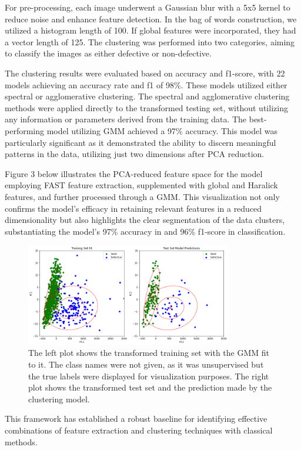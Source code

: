 \documentclass[conference]{IEEEtran}
\begin{document}
For pre-processing, each image underwent a Gaussian blur with a 5x5 kernel to reduce noise and enhance feature detection. In the bag of words construction, we utilized a histogram length of 100. If global features were incorporated, they had a vector length of 125. The clustering was performed into two categories, aiming to classify the images as either defective or non-defective.

The clustering results were evaluated based on accuracy and f1-score, with 22 models achieving an accuracy rate and f1 of 98\%. These models utilized either spectral or agglomerative clustering. The spectral and agglomerative clustering methods were applied directly to the transformed testing set, without utilizing any information or parameters derived from the training data. The best-performing model utilizing GMM achieved a 97\% accuracy. This model was particularly significant as it demonstrated the ability to discern meaningful patterns in the data, utilizing just two dimensions after PCA reduction.

Figure 3 below illustrates the PCA-reduced feature space for the model employing FAST feature extraction, supplemented with global and Haralick features, and further processed through a GMM. This visualization not only confirms the model's efficacy in retaining relevant features in a reduced dimensionality but also highlights the clear segmentation of the data clusters, substantiating the model's 97\% accuracy in and 96\% f1-score in classification.

\begin{figure}[h]
    \includegraphics[width=9cm]{classical_img.png}
    \centering
    \caption{The left plot shows the transformed training set with the GMM fit to it. The class names were not given, as it was unsupervised but the true labels were displayed for visualization purposes. The right plot shows the transformed test set and the prediction made by the clustering model.}
\label{fig:recon}
\end{figure}

This framework has established a robust baseline for identifying effective combinations of feature extraction and clustering techniques with classical methods.
\end{document}
